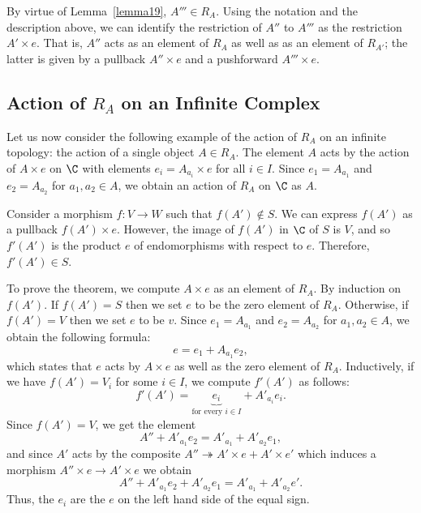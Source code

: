 \documentclass[a4paper,reqno,oneside]{article}
\begin{document}
By virtue of Lemma~\ref{lemma19}, $A''' \in R_A$.  Using the notation and the description above, we can identify the restriction of $A''$ to $A'''$ as the restriction $A' \times e$.  That is, $A''$ acts as an element of $R_A$ as well as as an element of $R_{A'}$; the latter is given by a pullback $A'' \times e$ and a pushforward $A''' \times e$.

\subsection{Action of $R_A$ on an Infinite Complex}

Let us now consider the following example of the action of $R_A$ on an infinite topology: the action of a single object $A \in R_A$.  The element $A$ acts by the action of $A \times e$ on $\C$ with elements $e_i = A_{a_i} \times e$ for all $i \in I$.  Since $e_1 = A_{a_1}$ and $e_2 = A_{a_2}$ for $a_1,a_2 \in A$, we obtain an action of $R_A$ on $\C$ as $A$.  

Consider a morphism $f: V \to W$ such that $f(A') \notin S$.  We can express $f(A')$ as a pullback $f(A') \times e$.  However, the image of $f(A')$ in $\C$ of $S$ is $V$, and so $f'(A')$ is the product $e$ of endomorphisms with respect to $e$.  Therefore, $f'(A') \in S$.

To prove the theorem, we compute $A \times e$ as an element of $R_A$.  By induction on $f(A')$.  If $f(A') = S$ then we set $e$ to be the zero element of $R_A$.  Otherwise, if $f(A') = V$ then we set $e$ to be $v$.  Since $e_1 = A_{a_1}$ and $e_2 = A_{a_2}$ for $a_1,a_2 \in A$, we obtain the following formula:
$$
e = e_1 + A_{a_1}e_2,
$$
which states that $e$ acts by $A \times e$ as well as the zero element of $R_A$.  Inductively, if we have $f(A') = V_i$ for some $i \in I$, we compute $f'(A')$ as follows:
\begin{equation}
    \label{eq:pullback}
    f'(A') = \underbrace{e_i}_{\text{for every } i \in I} + A'_{a_i}e_i.
\end{equation}
Since $f(A') = V$, we get the element
$$
A'' + A'_{a_1}e_2 = A'_{a_1} + A'_{a_2}e_1,
$$
and since $A'$ acts by the composite $A'' \twoheadrightarrow A' \times e + A' \times e'$ which induces a morphism $A'' \times e \to A' \times e$ we obtain
$$
A'' + A'_{a_1}e_2 + A'_{a_2}e_1 = A'_{a_1} + A'_{a_2}e'.
$$
Thus, the $e_i$ are the $e$ on the left hand side of the equal sign.
\end{document}
